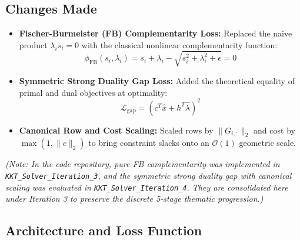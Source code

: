 \documentclass[11pt,a4paper]{article}
\begin{document}
\subsection{Changes Made}
\begin{itemize}[leftmargin=1.5em, itemsep=2pt]
    \item \textbf{Fischer-Burmeister (FB) Complementarity Loss:} Replaced the naive product $\lambda_i s_i = 0$ with the classical nonlinear complementarity function:
    \begin{equation}
        \phi_{\text{FB}}(s_i, \lambda_i) = s_i + \lambda_i - \sqrt{s_i^2 + \lambda_i^2 + \epsilon} = 0
    \end{equation}
    \item \textbf{Symmetric Strong Duality Gap Loss:} Added the theoretical equality of primal and dual objectives at optimality:
    \begin{equation}
        \mathcal{L}_{\text{gap}} = (c^T \hat{x} + h^T \hat{\lambda})^2
    \end{equation}
    \item \textbf{Canonical Row and Cost Scaling:} Scaled rows by $\|G_{i,:}\|_2$ and cost by $\max(1, \|c\|_2)$ to bring constraint slacks onto an $\mathcal{O}(1)$ geometric scale.
\end{itemize}
\noindent\textit{\small(Note: In the code repository, pure FB complementarity was implemented in \texttt{KKT\_Solver\_Iteration\_3}, and the symmetric strong duality gap with canonical scaling was evaluated in \texttt{KKT\_Solver\_Iteration\_4}. They are consolidated here under Iteration 3 to preserve the discrete 5-stage thematic progression.)}

\subsection{Architecture and Loss Function}
\end{document}
